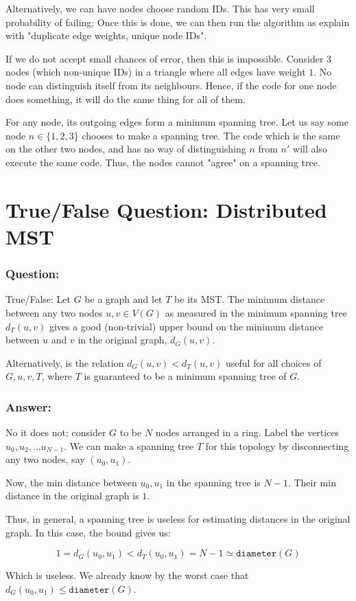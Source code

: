 \documentclass{article}
\begin{document}
Alternatively, we can have nodes choose random IDs. This has very small probability
of failing; Once this is done, we can then run the algorithm as explain with
"duplicate edge weights, unique node IDs".

If we do not accept small chances of error, then this is impossible.
Consider 3 nodes (which non-unique IDs) in a triangle where all edges have
weight $1$.  No node can distinguish itself from its
neighbours. Hence, if the code for one node does something, it will do the
same thing for all of them.

For any node, its outgoing edges form a minimum spanning tree. Let us say
some node $n \in \{1, 2, 3\}$ chooses to make a spanning tree. The code which is the
same on the other two nodes, and has no way of distinguishing $n$ from $n'$
will also execute the same code. Thus, the nodes cannot "agree" on a spanning
tree.

\section{True/False Question: Distributed MST}
\subsubsection{Question:}
True/False: Let $G$ be a graph and let $T$ be its MST. The minimum distance between any two nodes $u, v \in V(G)$
as measured in the minimum spanning tree $d_T(u, v)$ gives a good (non-trivial) upper
bound on the minimum distance between $u$ and $v$ in the original graph, $d_G(u, v)$.

Alternatively, is the relation $d_G(u, v) < d_T(u, v)$ useful for all choices
of $G, u, v, T$, where $T$ is guaranteed to be a minimum spanning tree of $G$.

\subsubsection{Answer:} No it does not; consider $G$ to be $N$ nodes arranged
in a ring. Label the vertices $u_0, u_2, \dots u_{N-1}$. We can
make a spanning tree $T$ for this topology by disconnecting any two nodes, say $(u_0, u_1)$.

Now, the min distance between $u_0, u_1$ in the spanning tree is $N-1$. Their
min distance in the original graph is $1$. 

Thus, in general, a spanning tree is useless for estimating distances in
the original graph. In this case, the bound gives us:

$$
1 = d_G(u_0, u_1) < d_T(u_0, u_1) = N - 1 \simeq \texttt{diameter}(G)
$$

Which is useless. We already know by the worst case that $d_G(u_0, u_1) \leq \texttt{diameter}(G)$.
\end{document}

